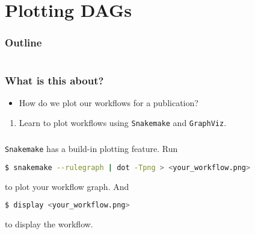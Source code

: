 \section{Plotting DAGs}

\begin{frame}
    \frametitle{Outline}
    \begin{columns}[t]
        \begin{column}{.5\textwidth}
            \tableofcontents[sections={1-9},currentsection]
        \end{column}
        \begin{column}{.5\textwidth}
            \tableofcontents[sections={10-18},currentsection]
        \end{column}
    \end{columns}
\end{frame}

\begin{frame}
  \frametitle{What is this about?}
   \begin{question}[Questions]
   	 \begin{itemize}
       \item How do we plot our workflows for a publication?
     \end{itemize}
   \end{question}
   \begin{docs}[Objectives]
   	  \begin{enumerate} 
                      \item Learn to plot workflows using \texttt{Snakemake} and \texttt{GraphViz}.
      \end{enumerate}
   \end{docs}
\end{frame}

\begin{frame}[fragile]
  \frametitle{}
  \texttt{Snakemake} has a build-in plotting feature. Run 
  \begin{lstlisting}[language=Bash, style=Shell]
$ snakemake --rulegraph | dot -Tpng > <your_workflow.png>
  \end{lstlisting}
  to plot your workflow graph. And
  \begin{lstlisting}[language=Bash, style=Shell]
$ display <your_workflow.png>
  \end{lstlisting}
  to display the workflow.
\end{frame}

